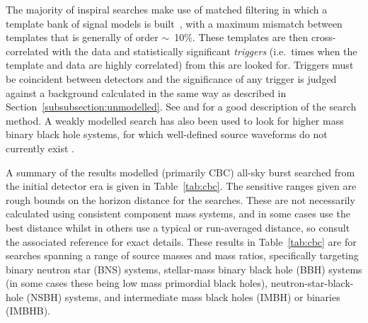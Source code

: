 The majority of inspiral searches make use of matched filtering in which a template bank of signal models is 
built~\cite{Owen:1996, Owen:1999}, with a maximum mismatch between templates that is generally of order 
$\sim$~10\%. These templates are then cross-correlated with the data and statistically significant
\textit{triggers} (i.e.\ times when the template and data are highly correlated) from this are looked for. 
Triggers must be coincident between detectors and the significance of any trigger is judged against a 
background calculated in the same way as described in Section~\ref{subsubsection:unmodelled}. See
\cite{Abbott:2005b} and \cite{2012PhRvD..85l2006A} for a good description of the search method. A weakly 
modelled search has also been used to look for higher mass binary black hole systems, for which well-defined 
source waveforms do not currently exist \cite{2008CQGra..25k4029K, 2012PhRvD..85j2004A}.

A summary of the results modelled (primarily CBC) all-sky burst searched from the initial detector era is 
given in Table~\ref{tab:cbc}. The sensitive ranges given are rough bounds on the horizon distance for the searches. These are 
not necessarily calculated using consistent component mass systems, and in some cases use the best distance 
whilst in others use a typical or run-averaged distance, so consult the associated reference for exact details. 
These results in Table~\ref{tab:cbc} are for searches spanning a range of source masses and mass ratios,
specifically targeting binary neutron star (BNS) systems, stellar-mass binary black hole (BBH) systems (in some cases these being
low mass primordial black holes), neutron-star-black-hole (NSBH) systems, and intermediate mass black holes (IMBH) or binaries (IMBHB).


